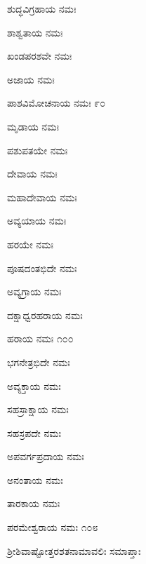 ಶುದ್ಧವಿಗ್ರಹಾಯ ನಮಃ

ಶಾಶ್ವತಾಯ ನಮಃ

ಖಂಡಪರಶವೇ ನಮಃ

ಅಜಾಯ ನಮಃ

ಪಾಶವಿಮೋಚನಾಯ ನಮಃ \num{೯೦}

ಮೃಡಾಯ ನಮಃ

ಪಶುಪತಯೇ ನಮಃ

ದೇವಾಯ ನಮಃ

ಮಹಾದೇವಾಯ ನಮಃ

ಅವ್ಯಯಾಯ ನಮಃ

ಹರಯೇ ನಮಃ

ಪೂಷದಂತಭಿದೇ ನಮಃ

ಅವ್ಯಗ್ರಾಯ ನಮಃ

ದಕ್ಷಾಧ್ವರಹರಾಯ ನಮಃ

ಹರಾಯ ನಮಃ \num{೧೦೦}

ಭಗನೇತ್ರಭಿದೇ ನಮಃ

ಅವ್ಯಕ್ತಾಯ ನಮಃ

ಸಹಸ್ರಾಕ್ಷಾಯ ನಮಃ

ಸಹಸ್ರಪದೇ ನಮಃ

ಅಪವರ್ಗಪ್ರದಾಯ ನಮಃ

ಅನಂತಾಯ ನಮಃ

ತಾರಕಾಯ ನಮಃ

ಪರಮೇಶ್ವರಾಯ ನಮಃ \num{೧೦೮}

\begin{center}
ಶ್ರೀಶಿವಾಷ್ಟೋತ್ತರಶತನಾಮಾವಲಿಃ ಸಮಾಪ್ತಾಃ
\end{center}

